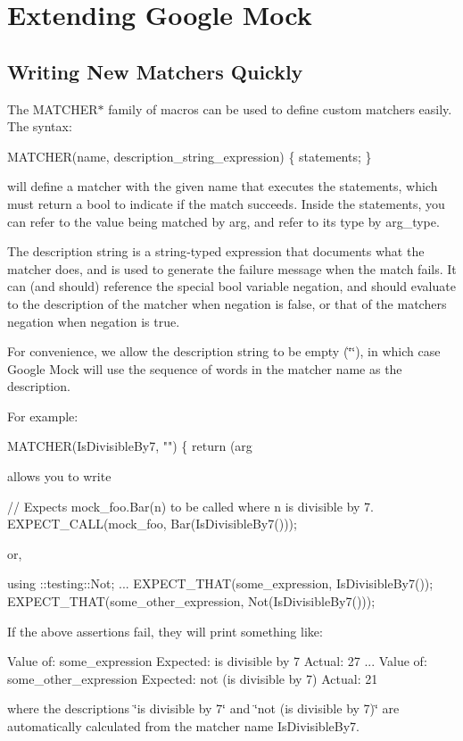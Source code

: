 \section*{Extending Google Mock}

\subsection*{Writing New Matchers Quickly}

The {\ttfamily M\+A\+T\+C\+H\+E\+R$\ast$} family of macros can be used to define custom matchers easily. The syntax\+:


\begin{DoxyCode}
MATCHER(name, description\_string\_expression) \{ statements; \}
\end{DoxyCode}


will define a matcher with the given name that executes the statements, which must return a {\ttfamily bool} to indicate if the match succeeds. Inside the statements, you can refer to the value being matched by {\ttfamily arg}, and refer to its type by {\ttfamily arg\+\_\+type}.

The description string is a {\ttfamily string}-\/typed expression that documents what the matcher does, and is used to generate the failure message when the match fails. It can (and should) reference the special {\ttfamily bool} variable {\ttfamily negation}, and should evaluate to the description of the matcher when {\ttfamily negation} is {\ttfamily false}, or that of the matcher\textquotesingle{}s negation when {\ttfamily negation} is {\ttfamily true}.

For convenience, we allow the description string to be empty ({\ttfamily \char`\"{}\char`\"{}}), in which case Google Mock will use the sequence of words in the matcher name as the description.

For example\+: 
\begin{DoxyCode}
MATCHER(IsDivisibleBy7, \textcolor{stringliteral}{""}) \{ \textcolor{keywordflow}{return} (arg %
\end{DoxyCode}
 allows you to write 
\begin{DoxyCode}
\textcolor{comment}{// Expects mock\_foo.Bar(n) to be called where n is divisible by 7.}
EXPECT\_CALL(mock\_foo, Bar(IsDivisibleBy7()));
\end{DoxyCode}
 or, 
\begin{DoxyCode}
using ::testing::Not;
...
  EXPECT\_THAT(some\_expression, IsDivisibleBy7());
  EXPECT\_THAT(some\_other\_expression, Not(IsDivisibleBy7()));
\end{DoxyCode}
 If the above assertions fail, they will print something like\+: 
\begin{DoxyCode}
  Value of: some\_expression
  Expected: is divisible by 7
    Actual: 27
...
  Value of: some\_other\_expression
  Expected: not (is divisible by 7)
    Actual: 21
\end{DoxyCode}
 where the descriptions {\ttfamily \char`\"{}is divisible by 7\char`\"{}} and {\ttfamily \char`\"{}not (is divisible
by 7)\char`\"{}} are automatically calculated from the matcher name {\ttfamily Is\+Divisible\+By7}.

